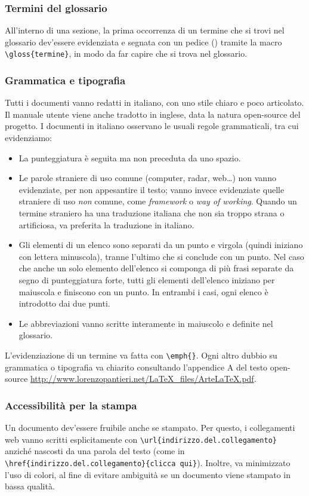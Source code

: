 		\subsubsection{Termini del glossario} 
			All'interno di una sezione, la prima occorrenza di un termine che si trovi nel glossario dev'essere evidenziata e segnata con un pedice () tramite la macro \texttt{\textbackslash gloss\{termine\}}, in modo da far capire che si trova nel glossario.
		
		\subsubsection{Grammatica e tipografia} 
			Tutti i documenti vanno redatti in italiano, con uno stile chiaro e poco articolato. Il manuale utente viene anche tradotto in inglese, data la natura open-source del progetto. I documenti in italiano osservano le usuali regole grammaticali, tra cui evidenziamo:
			\begin{itemize}
				\item La punteggiatura è seguita ma non preceduta da uno spazio.
				\item Le parole straniere di uso comune (computer, radar, web\dots) non vanno evidenziate, per non appesantire il testo; vanno invece evidenziate quelle straniere di uso \emph{non} comune, come \emph{framework} o \emph{way of working}. Quando un termine straniero ha una traduzione italiana che non sia troppo strana o artificiosa, va preferita la traduzione in italiano.
				\item Gli elementi di un elenco sono separati da un punto e virgola (quindi iniziano con lettera minuscola), tranne l'ultimo che si conclude con un punto. Nel caso che anche un solo elemento dell'elenco si componga di più frasi separate da segno di punteggiatura forte, tutti gli elementi dell'elenco iniziano per maiuscola e finiscono con un punto. In entrambi i casi, ogni elenco è introdotto dai due punti.
				\item Le abbreviazioni vanno scritte interamente in maiuscolo e definite nel glossario.
			\end{itemize}
			L'evidenziazione di un termine va fatta con \texttt{\textbackslash emph\{\}}. Ogni altro dubbio su grammatica o tipografia va chiarito consultando l'appendice A del testo open-source \url{http://www.lorenzopantieri.net/LaTeX_files/ArteLaTeX.pdf}.
		
		\subsubsection{Accessibilità per la stampa} 
			Un documento dev'essere fruibile anche se stampato. Per questo, i collegamenti web vanno scritti esplicitamente con \texttt{\textbackslash url\{indirizzo.del.collegamento\}} anziché nascosti da una parola del testo (come in \texttt{\textbackslash href\{indirizzo.del.collegamento\}\{clicca qui\}}). Inoltre, va minimizzato l'uso di colori, al fine di evitare ambiguità se un documento viene stampato in bassa qualità.	
